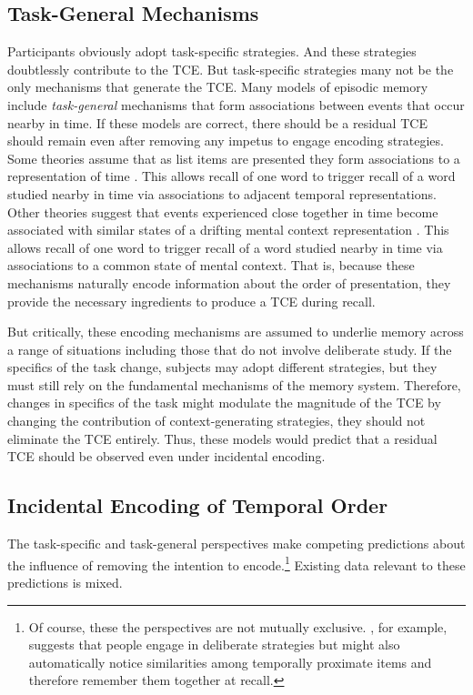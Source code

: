 \documentclass[man,natbib,floatsintext]{apa6} %
\begin{document}
\subsection{Task-General Mechanisms}
Participants obviously adopt task-specific strategies. And these strategies doubtlessly contribute to the TCE. But task-specific strategies many not be the only mechanisms that generate the TCE. Many models of episodic memory include \emph{task-general} mechanisms that form associations between events that occur nearby in time. If these models are correct, there should be a residual TCE should remain even after removing any impetus to engage encoding strategies. Some theories assume that as list items are presented they form associations to a representation of time \citep{HowaEtal14a,BrowEtal07}. This allows recall of one word to trigger recall of a word studied nearby in time via associations to adjacent temporal representations. Other theories suggest that events experienced close together in time become associated with similar states of a drifting mental context representation \citep{PolyEtal09,LohnEtal14,McGe32}. This allows recall of one word to trigger recall of a word studied nearby in time via associations to a common state of mental context. That is, because these mechanisms naturally encode information about the order of presentation, they provide the necessary ingredients to produce a TCE during recall. 

But critically, these encoding mechanisms are assumed to underlie memory across a range of situations including those that do not involve deliberate study. If the specifics of the task change, subjects may adopt different strategies, but they must still rely on the fundamental mechanisms of the memory system. Therefore, changes in specifics of the task might modulate the magnitude of the TCE by changing the contribution of context-generating strategies, they should not eliminate the TCE entirely. Thus, these models would predict that a residual TCE should be observed even under incidental encoding. 

\subsection{Incidental Encoding of Temporal Order}
The task-specific and task-general perspectives make competing predictions about the influence of removing the intention to encode.\footnote{Of course, these the perspectives are not mutually exclusive. \citet{Hint16}, for example, suggests that people engage in deliberate strategies but might also automatically notice similarities among temporally proximate items and therefore remember them together at recall.} Existing data relevant to these predictions is mixed. 
\end{document}

